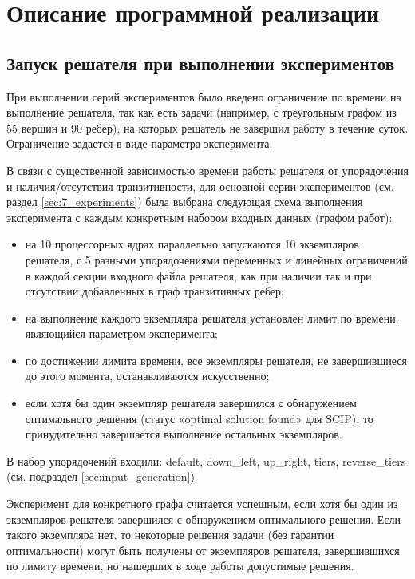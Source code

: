 \section{Описание программной реализации}
\label{sec:5_alg_description} 

\subsection{Запуск решателя при выполнении экспериментов}
\label{sec:solver_run}



При выполнении серий экспериментов было введено ограничение по времени на
выполнение решателя, так как есть задачи (например, с треугольным графом из 55
вершин и 90 ребер), на которых решатель не завершил работу в течение
суток. Ограничение задается в виде параметра эксперимента.

В связи с существенной зависимостью времени работы решателя от упорядочения и наличия/отсутствия транзитивности, для основной серии экспериментов (см. раздел \ref{sec:7_experiments}) была выбрана следующая схема выполнения эксперимента с каждым конкретным набором входных данных (графом работ):
\begin{itemize}
    \item на 10 процессорных ядрах параллельно запускаются 10 экземпляров
решателя, с 5 разными упорядочениями переменных и линейных
ограничений в каждой секции входного файла решателя, как при наличии так и при отсутствии добавленных в граф транзитивных ребер;
    \item на выполнение каждого экземпляра решателя установлен лимит по
времени, являющийся параметром эксперимента;
    \item по достижении лимита времени, все экземпляры решателя, не завершившиеся до
этого момента, останавливаются искусственно;
    \item если хотя бы один экземпляр решателя завершился с обнаружением оптимального решения (статус «optimal solution found» для SCIP), то принудительно завершается выполнение остальных экземпляров.
\end{itemize}

В набор упорядочений входили: default, down\_left, up\_right, tiers, reverse\_tiers (см. подраздел \ref{sec:input_generation}). 

Эксперимент для конкретного графа считается успешным, если хотя бы один из
экземпляров решателя завершился с обнаружением оптимального решения. Если
такого экземпляра нет, то некоторые решения задачи (без гарантии
оптимальности) могут быть получены от экземпляров решателя, завершившихся по лимиту времени, но нашедших в ходе работы допустимые решения.

